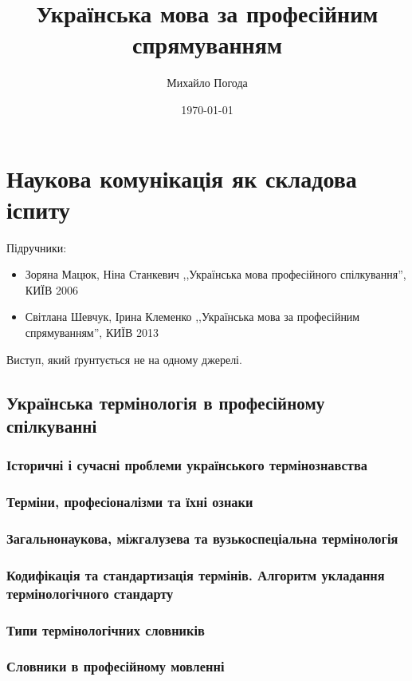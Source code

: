 \documentclass[a4paper,10pt,notitlepage,pdftex,headsepline]{scrartcl}
\author{Михайло Погода}
\title{Українська мова за професійним спрямуванням}
\date{\today}
\begin{document}
  \maketitle

\section{Наукова комунікація як складова іспиту}
  Підручники:
  \begin{itemize}
      \item Зоряна Мацюк, Ніна Станкевич ,,Українська мова професійного
          спілкування'', КИЇВ 2006
      \item Світлана Шевчук, Ірина Клеменко ,,Українська мова за професійним
          спрямуванням'', КИЇВ 2013
  \end{itemize}

  Виступ, який ґрунтується не на одному джерелі.

  \subsection{Українська термінологія в професійному спілкуванні}
      \subsubsection{Історичні і сучасні проблеми українського термінознавства}
      \subsubsection{Терміни, професіоналізми та їхні ознаки}
      \subsubsection{Загальнонаукова, міжгалузева та вузькоспеціальна
      термінологія}
      \subsubsection{Кодифікація та стандартизація термінів. Алгоритм укладання
      термінологічного стандарту}
      \subsubsection{Типи термінологічних словників}
      \subsubsection{Словники в професійному мовленні}
\end{document}
